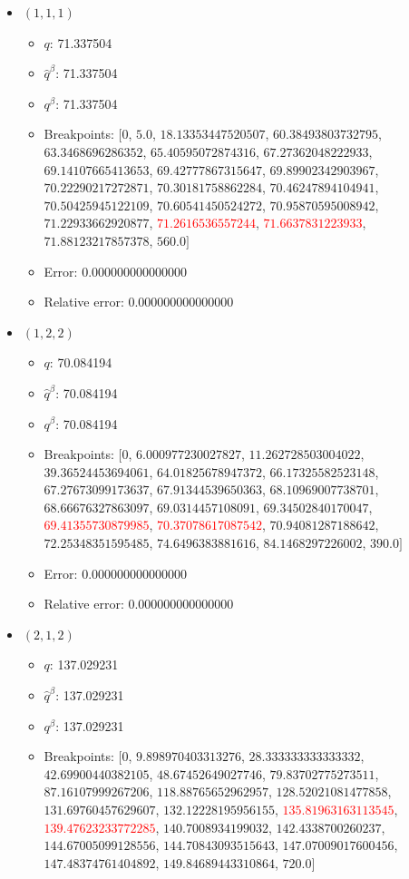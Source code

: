 \documentclass{article}%
\begin{document}
\begin{itemize}%
	\item $(1, 1, 1)$%
	\begin{itemize}%
		\item $q$: 71.337504%
		\item $\hat{q}^\beta$: 71.337504%
		\item $q^\beta$: 71.337504%
		\item Breakpoints: $[$$0$, $5.0$, $18.13353447520507$, $60.38493803732795$, $63.3468696286352$, $65.40595072874316$, $67.27362048222933$, $69.14107665413653$, $69.42777867315647$, $69.89902342903967$, $70.22290217272871$, $70.30181758862284$, $70.46247894104941$, $70.50425945122109$, $70.60541450524272$, $70.95870595008942$, $71.22933662920877$, \textcolor{red}{$71.2616536557244$}, \textcolor{red}{$71.6637831223933$}, $71.88123217857378$, $560.0$$]$%
		\item Error: 0.000000000000000%
		\item Relative error: 0.000000000000000%
	\end{itemize}%
	\item $(1, 2, 2)$%
	\begin{itemize}%
		\item $q$: 70.084194%
		\item $\hat{q}^\beta$: 70.084194%
		\item $q^\beta$: 70.084194%
		\item Breakpoints: $[$$0$, $6.000977230027827$, $11.262728503004022$, $39.36524453694061$, $64.01825678947372$, $66.17325582523148$, $67.27673099173637$, $67.91344539650363$, $68.10969007738701$, $68.66676327863097$, $69.0314457108091$, $69.34502840170047$, \textcolor{red}{$69.41355730879985$}, \textcolor{red}{$70.37078617087542$}, $70.94081287188642$, $72.25348351595485$, $74.6496383881616$, $84.1468297226002$, $390.0$$]$%
		\item Error: 0.000000000000000%
		\item Relative error: 0.000000000000000%
	\end{itemize}%
	\item $(2, 1, 2)$%
	\begin{itemize}%
		\item $q$: 137.029231%
		\item $\hat{q}^\beta$: 137.029231%
		\item $q^\beta$: 137.029231%
		\item Breakpoints: $[$$0$, $9.898970403313276$, $28.333333333333332$, $42.69900440382105$, $48.67452649027746$, $79.83702775273511$, $87.16107999267206$, $118.88765652962957$, $128.52021081477858$, $131.69760457629607$, $132.12228195956155$, \textcolor{red}{$135.81963163113545$}, \textcolor{red}{$139.47623233772285$}, $140.7008934199032$, $142.4338700260237$, $144.67005099128556$, $144.70843093515643$, $147.07009017600456$, $147.48374761404892$, $149.84689443310864$, $720.0$$]$%

\end{itemize}
\end{itemize}
\end{document}

